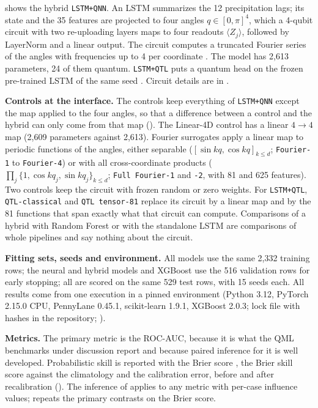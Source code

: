 \documentclass[11pt,a4paper]{article}
\begin{document}
 shows the hybrid \texttt{LSTM+QNN}. An LSTM summarizes the 12 precipitation lags; its state and the 35 features are projected to four angles $q\in[0,\pi]^4$, which a 4-qubit circuit with two re-uploading layers maps to four readouts $\langle Z_j\rangle$, followed by LayerNorm and a linear output. The circuit computes a truncated Fourier series of the angles with frequencies up to 4 per coordinate \citep{schuld2021fourier}. The model has 2{,}613 parameters, 24 of them quantum. \texttt{LSTM+QTL} puts a quantum head on the frozen pre-trained LSTM of the same seed \citep{mari2020}. Circuit details are in .

\textbf{Controls at the interface.} The controls keep everything of \texttt{LSTM+QNN} except the map applied to the four angles, so that a difference between a control and the hybrid can only come from that map (). The Linear-4D control has a linear $4\to4$ map (2{,}609 parameters against 2{,}613). Fourier surrogates apply a linear map to periodic functions of the angles, either separable ($[\sin kq,\cos kq]_{k\le d}$; \texttt{Fourier-1} to \texttt{Fourier-4}) or with all cross-coordinate products ($\prod_{j}\{1,\cos kq_j,\sin kq_j\}_{k\le d}$; \texttt{Full Fourier-1} and \texttt{-2}, with 81 and 625 features). Two controls keep the circuit with frozen random or zero weights. For \texttt{LSTM+QTL}, \texttt{QTL-classical} and \texttt{QTL tensor-81} replace its circuit by a linear map and by the 81 functions that span exactly what that circuit can compute. Comparisons of a hybrid with Random Forest or with the standalone LSTM are comparisons of whole pipelines and say nothing about the circuit.

\textbf{Fitting sets, seeds and environment.} All models use the same 2{,}332 training rows; the neural and hybrid models and XGBoost use the 516 validation rows for early stopping; all are scored on the same 529 test rows, with 15 seeds each. All results come from one execution in a pinned environment (Python 3.12, PyTorch 2.15.0 CPU, PennyLane 0.45.1, scikit-learn 1.9.1, XGBoost 2.0.3; lock file with hashes in the repository; ).

\textbf{Metrics.} The primary metric is the ROC-AUC, because it is what the QML benchmarks under discussion report and because paired inference for it is well developed. Probabilistic skill is reported with the Brier score \citep{brier1950}, the Brier skill score against the climatology and the calibration error, before and after recalibration (). The inference of  applies to any metric with per-case influence values;  repeats the primary contrasts on the Brier score.
\end{document}
